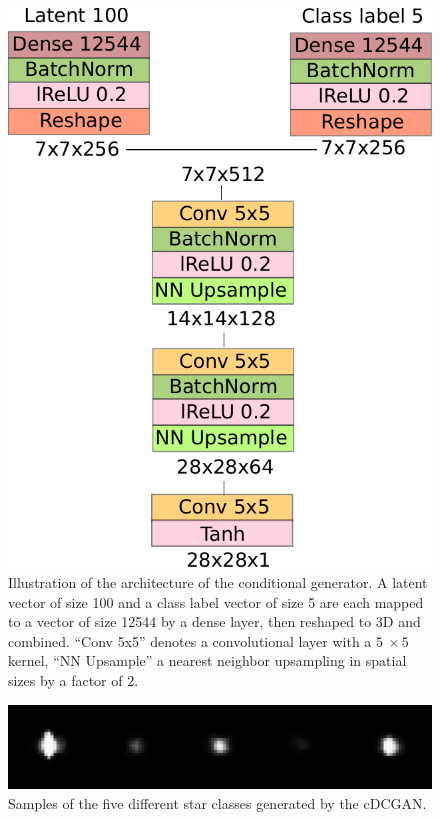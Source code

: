 \documentclass[10pt,conference,compsocconf]{IEEEtran}
\begin{document}
\begin{figure}
    \centering
    \includegraphics[width=0.58\columnwidth]{assets/cgen_arch.pdf}
    \caption{Illustration of the architecture of the conditional generator. A latent vector of size \SI{100}{} and a class label vector of size \SI{5}{} are each mapped to a vector of size \SI{12544}{} by a dense layer, then reshaped to 3D and combined. ``Conv 5x5'' denotes a convolutional layer with a $\SI{5}{}\times\SI{5}{}$ kernel, ``NN Upsample'' a nearest neighbor upsampling in spatial sizes by a factor of \SI{2}{}.}
    \label{fig:cgen_arch}
\end{figure}

\begin{figure}
    \centering
    \includegraphics[width=\columnwidth]{assets/clustered_generated_stars_resized.png}
    \caption{Samples of the five different star classes generated by the cDCGAN.}
    \label{fig:clustered_generated_stars}
\end{figure}
\end{document}
